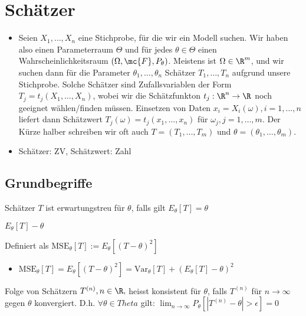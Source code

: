 
\section{Schätzer}
\begin{itemize}
    \item Seien $X_1, \dots, X_n$ eine Stichprobe, für die wir ein Modell suchen. Wir haben also einen Parameterraum $\Theta$ und für jedes $\theta \in \Theta$ einen Wahrscheinlichkeitsraum $(\Omega, \mc{F}, P_\theta)$. Meistens ist $\Omega \in \R^m$, und wir suchen dann für die Parameter $\theta_1, \dots, \theta_n$ Schätzer $T_1, \dots, T_n$ aufgrund unsere Stichprobe. Solche Schätzer sind Zufallsvariablen der Form $T_j = t_j(X_1, \dots, X_n)$, wobei wir die Schätzfunkton $t_j: \R^n \to \R$ noch geeignet wählen/finden müssen. Einsetzen von Daten $x_i = X_i(\omega), i = 1, \dots, n$ liefert dann Schätzwert $T_j(\omega) = t_j(x_1, \dots, x_n)$ für $\omega_j, j = 1, \dots, m$. Der Kürze halber schreiben wir oft auch $T = (T_1, \dots, T_m)$ und $\theta = (\theta_1, \dots, \theta_m)$.
    \item Schätzer: ZV, Schätzwert: Zahl
\end{itemize}

\subsection{Grundbegriffe}
\begin{itemize}
     Schätzer $T$ ist erwartungstreu für $\theta$, falls gilt $E_\theta[T] = \theta$
        \begin{itemize}
             $E_\theta[T] - \theta$
        \end{itemize}
     Definiert als $\text{MSE}_\theta[T] := E_\theta[(T - \theta)^2]$
        \begin{itemize}
            \item $\text{MSE}_\theta[T] = E_\theta[(T - \theta)^2] = \text{Var}_\theta[T] + (E_\theta[T] - \theta)^2$
        \end{itemize}
     Folge von Schätzern $T^{(n)}, n \in \R,$ heisst konsistent für $\theta$, falls $T^{(n)}$ für $n \to \infty$ gegen $\theta$ konvergiert. D.h. $\forall \theta \in Theta$ gilt: $\lim_{n \to \infty} P_\theta[|T^{(n)} - \theta| > \epsilon] = 0$
\end{itemize}

